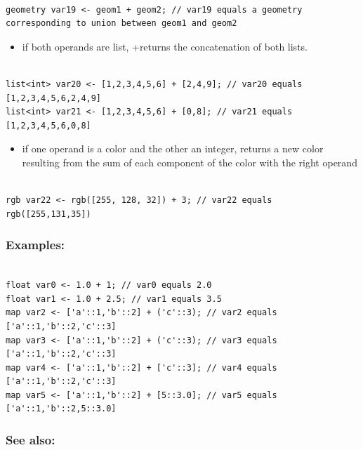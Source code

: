 \documentclass[]{book}
\providecommand{\tightlist}{%
  \setlength{\itemsep}{0pt}\setlength{\parskip}{0pt}}
\theoremstyle{definition}
\theoremstyle{definition}
\theoremstyle{definition}
\theoremstyle{remark}
\begin{document}
\begin{verbatim}
 
geometry var19 <- geom1 + geom2; // var19 equals a geometry corresponding to union between geom1 and geom2
\end{verbatim}

\begin{itemize}
\tightlist
\item
  if both operands are list, +returns the concatenation of both lists.
\end{itemize}

\begin{verbatim}
 
list<int> var20 <- [1,2,3,4,5,6] + [2,4,9]; // var20 equals [1,2,3,4,5,6,2,4,9] 
list<int> var21 <- [1,2,3,4,5,6] + [0,8]; // var21 equals [1,2,3,4,5,6,0,8]
\end{verbatim}

\begin{itemize}
\tightlist
\item
  if one operand is a color and the other an integer, returns a new
  color resulting from the sum of each component of the color with the
  right operand
\end{itemize}

\begin{verbatim}
 
rgb var22 <- rgb([255, 128, 32]) + 3; // var22 equals rgb([255,131,35])
\end{verbatim}

\subsubsection{Examples:}\label{examples-6}

\begin{verbatim}
 
float var0 <- 1.0 + 1; // var0 equals 2.0 
float var1 <- 1.0 + 2.5; // var1 equals 3.5 
map var2 <- ['a'::1,'b'::2] + ('c'::3); // var2 equals ['a'::1,'b'::2,'c'::3] 
map var3 <- ['a'::1,'b'::2] + ('c'::3); // var3 equals ['a'::1,'b'::2,'c'::3] 
map var4 <- ['a'::1,'b'::2] + ['c'::3]; // var4 equals ['a'::1,'b'::2,'c'::3] 
map var5 <- ['a'::1,'b'::2] + [5::3.0]; // var5 equals ['a'::1,'b'::2,5::3.0]
\end{verbatim}

\subsubsection{See also:}\label{see-also-8}
\end{document}

